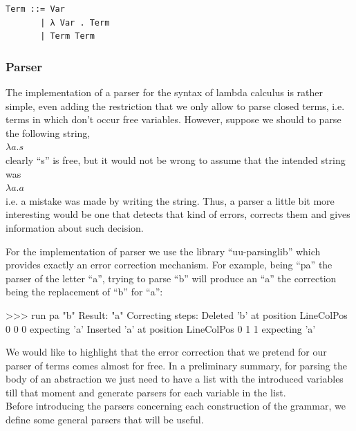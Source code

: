 \documentclass[a4paper,10pt]{article}
\newenvironment{code}{\footnotesize\verbatim}{\endverbatim\normalsize}
\begin{document}
\begin{lstlisting}
Term ::= Var
       | λ Var . Term
       | Term Term
\end{lstlisting}

\subsubsection{Parser}

The implementation of a parser for the syntax of lambda calculus is rather simple,
even adding the restriction that we only allow to parse closed terms, i.e. terms in which
don't occur free variables. However, suppose we should to parse the following string,\\

$\lambda a . s$\\

clearly ``s'' is free, but it would not be wrong to assume that the intended string was\\

$\lambda a . a$\\

i.e. a mistake was made by writing the string. Thus, a parser a little bit
more interesting would be one that detects that kind of errors, corrects them
and gives information about such decision.

For the implementation of parser we use the library ``uu-parsinglib''
which provides exactly an error correction mechanism. For example, being ``pa'' the
parser of the letter ``a'', trying to parse ``b'' will produce an ``a'' the correction
being the replacement of ``b'' for ``a'':

\begin{code}
 >>> run pa  "b"
     Result: "a"
     Correcting steps: 
       Deleted   'b' at position LineColPos 0 0 0 expecting 'a'
       Inserted  'a' at position LineColPos 0 1 1 expecting 'a'
\end{code}

We would like to highlight that the error correction that we pretend for our parser
of terms comes almost for free. In a preliminary summary, for parsing the body of an 
abstraction we just need to have a list with the introduced variables till that
moment and generate parsers for each variable in the list.\\

Before introducing the parsers concerning each construction of the grammar, 
we define some general parsers that will be useful.
\end{document}
